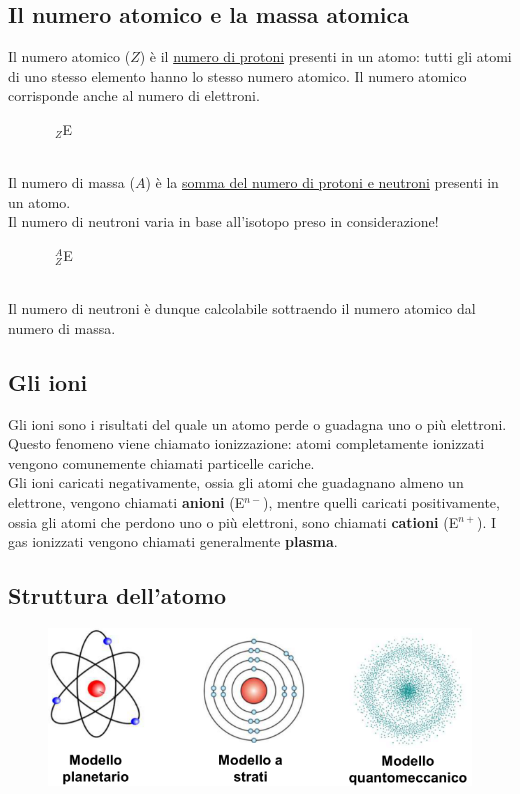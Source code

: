 \documentclass{article}
\begin{document}
\subsection{Il numero atomico e la massa atomica}
    Il numero atomico ($Z$) è il \underline{numero di protoni} presenti in un atomo:
    tutti gli atomi di uno stesso elemento hanno lo stesso numero atomico.
    Il numero atomico corrisponde anche al numero di elettroni.
        \begin{figure}[h]
            \centering {}\: \textrightarrow\ $_Z$E
        \end{figure} \\
    Il numero di massa ($A$) è la \underline{somma del numero di protoni e neutroni} presenti
    in un atomo.\\
    {\color{red}Il numero di neutroni varia in base all'isotopo preso in considerazione!}
        \begin{figure}[h]
            \centering {}\: \textrightarrow\ $^A_Z$E
        \end{figure} \\
    Il numero di neutroni è dunque calcolabile sottraendo il numero atomico dal numero di massa.
        \begin{figure}[h]
            \centering {}
        \end{figure}

\hypertarget{ioni}{}
\subsection{Gli ioni}
    Gli ioni sono i risultati del quale un atomo perde o guadagna uno o più elettroni.
    Questo fenomeno viene chiamato ionizzazione: atomi completamente ionizzati vengono comunemente
    chiamati particelle cariche.\\
    Gli ioni caricati negativamente, ossia gli atomi che guadagnano almeno un elettrone, vengono
    chiamati \textbf{anioni} (E$^{n-}$), mentre quelli caricati positivamente,
    ossia gli atomi che perdono uno o più elettroni, sono chiamati \textbf{cationi} (E$^{n+}$).
    I gas ionizzati vengono chiamati generalmente \textbf{plasma}.

\subsection{Struttura dell'atomo}
\begin{figure}[h!]
    \begin{center}
        \includegraphics[width=.6\textwidth]{Struttura_atomi.png}
    \end{center}
\end{figure}
\end{document}
